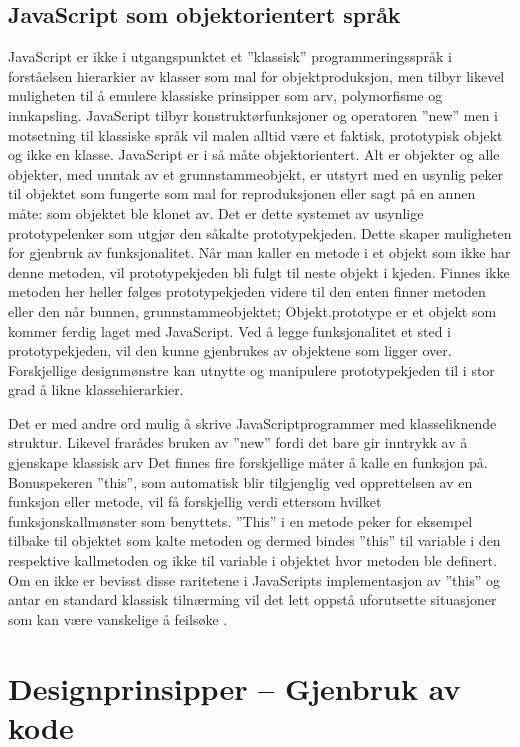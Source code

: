 \documentclass[norsk]{article}
\begin{document}
\subsection{JavaScript som objektorientert språk}
JavaScript er ikke i utgangspunktet et ”klassisk” programmeringsspråk i forståelsen hierarkier av klasser som mal for objektproduksjon, men tilbyr likevel muligheten til å emulere klassiske prinsipper som arv, polymorfisme og innkapsling. JavaScript tilbyr konstruktørfunksjoner og operatoren ”new” men i motsetning til klassiske språk vil malen alltid være et faktisk, prototypisk objekt og ikke en klasse. JavaScript er i så måte objektorientert. Alt er objekter og alle objekter, med unntak av et grunnstammeobjekt, er utstyrt med en usynlig peker til objektet som fungerte som mal for reproduksjonen eller sagt på en annen måte: som objektet ble klonet av. Det er dette systemet av usynlige prototypelenker som utgjør den såkalte prototypekjeden. Dette skaper muligheten for gjenbruk av funksjonalitet. Når man kaller en metode i et objekt som ikke har denne metoden, vil prototypekjeden bli fulgt til neste objekt i kjeden. Finnes ikke metoden her heller følges prototypekjeden videre til den enten finner metoden eller den når bunnen, grunnstammeobjektet; Objekt.prototype er et objekt som kommer ferdig laget med JavaScript. Ved å legge funksjonalitet et sted i prototypekjeden, vil den kunne gjenbrukes av objektene som ligger over. Forskjellige designmønstre kan utnytte og manipulere prototypekjeden til i stor grad å likne klassehierarkier. 

Det er med andre ord mulig å skrive JavaScriptprogrammer med klasseliknende struktur. Likevel frarådes bruken av ”new” fordi det bare gir inntrykk av å gjenskape klassisk arv \parencite{crockfordNew} Det finnes fire forskjellige måter å kalle en funksjon på. Bonuspekeren ”this”, som automatisk blir tilgjenglig ved opprettelsen av en funksjon eller metode, vil få forskjellig verdi ettersom hvilket funksjonskallmønster som benyttets. ”This” i en metode peker for eksempel tilbake til objektet som kalte metoden og dermed bindes ”this” til variable i den respektive kallmetoden og ikke til variable i objektet hvor metoden ble definert. Om en ikke er bevisst disse raritetene i JavaScripts implementasjon av ”this” og antar en standard klassisk tilnærming vil det lett oppstå uforutsette situasjoner som kan være vanskelige å feilsøke \parencite[s. 27-30]{crockfordGoodparts}.
\section{Designprinsipper – Gjenbruk av kode}
\end{document}
